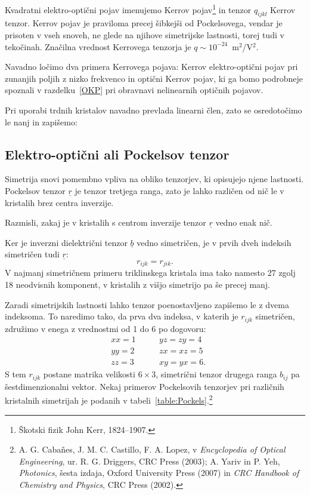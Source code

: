 Kvadratni elektro-optični pojav imenujemo Kerrov
pojav\footnote{Škotski fizik John Kerr, 1824--1907.} in tenzor $q_{ijkl}$ 
Kerrov tenzor. Kerrov pojav je praviloma precej šibkejši od Pockelsovega, vendar je prisoten 
v vseh snoveh, ne glede na njihove simetrijske lastnosti, torej tudi v tekočinah. 
Značilna vrednost Kerrovega tenzorja je $q \sim 10^{-24}$~m$^2$/V$^2$. 

Navadno ločimo dva primera Kerrovega pojava: Kerrov elektro-optični pojav 
pri zunanjih poljih z nizko frekvenco in optični Kerrov pojav, ki ga bomo  
podrobneje spoznali v razdelku~\ref{OKP} pri obravnavi nelinearnih optičnih pojavov.

Pri uporabi trdnih kristalov navadno prevlada linearni člen, zato se osredotočimo
le nanj in zapišemo:

\subsection*{Elektro-optični ali Pockelsov tenzor}
Simetrija snovi pomembno vpliva na obliko tenzorjev, ki opisujejo njene lastnosti.
Pockelsov tenzor $\underline{r}$ je tenzor tretjega ranga, zato je lahko različen
od nič le v kristalih brez centra inverzije. 
\begin{naloga}
Razmisli, zakaj je v kristalih s centrom inverzije tenzor $\underline{r}$
vedno enak nič. 
\end{naloga}

Ker je inverzni dielektrični tenzor $\underline{b}$ vedno simetričen, je v 
prvih dveh indeksih simetričen tudi $\underline{r}$:
\begin{equation}
r_{ijk} = r_{jik}.
\end{equation}
V najmanj simetričnem primeru triklinskega kristala ima tako namesto 27 zgolj 
18 neodvisnih komponent, v kristalih z višjo simetrijo pa še precej manj. 

Zaradi simetrijskih lastnosti lahko tenzor poenostavljeno zapišemo le z dvema
indeksoma. To naredimo tako, da prva dva indeksa, v katerih je $r_{ijk}$ simetričen, združimo
v enega z vrednostmi od 1 do 6 po dogovoru:
\begin{eqnarray}
 &xx=1 \qquad  &yz=zy = 4 \\
 &yy=2 \qquad  &zx=xz = 5 \\
 &zz=3 \qquad  &xy=yx = 6.
\end{eqnarray}
S tem $r_{ijk}$ postane matrika velikosti $6\times3$, simetrični tenzor drugega 
ranga $b_{ij}$ pa šestdimenzionalni vektor.
Nekaj primerov Pockelsovih tenzorjev pri različnih kristalnih simetrijah
je podanih v tabeli~\ref{table:Pockels}.\footnote{A. G. Caba\~nes, J. M. C. Castillo, F. A. Lopez,
v {\it Encyclopedia of Optical Engineering}, ur. R. G. Driggers, CRC Press (2003); A. Yariv in 
P. Yeh, {\it Photonics}, šesta izdaja, Oxford University Press (2007) in
{\it CRC Handbook of Chemistry and Physics}, CRC Press (2002).}

